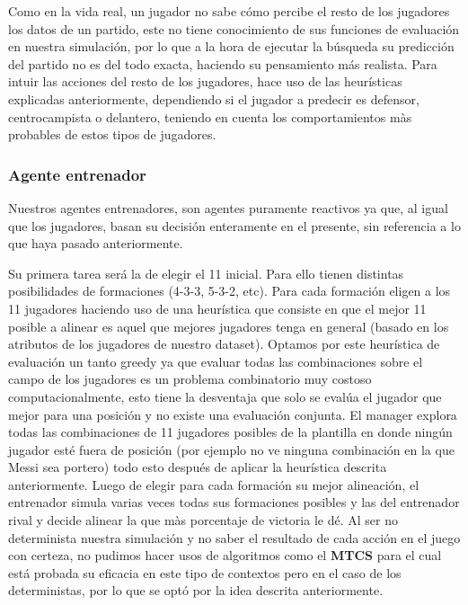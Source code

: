 \documentclass{article}
\begin{document}
Como en la vida real, un jugador no sabe cómo percibe el resto de los jugadores los datos de un partido, este no 
tiene conocimiento de sus funciones de evaluación en nuestra simulación, por lo que a la hora de ejecutar la búsqueda
su predicción del partido no es del todo exacta, haciendo su pensamiento más realista. Para intuir las acciones del 
resto de los jugadores, hace uso de las heurísticas explicadas anteriormente, dependiendo si el jugador a predecir 
es defensor, centrocampista o delantero, teniendo en cuenta los comportamientos màs probables de estos tipos de 
jugadores.

\subsubsection{Agente entrenador}
Nuestros agentes entrenadores, son agentes puramente reactivos ya que, al igual que los jugadores, basan 
su decisión enteramente en el presente, sin referencia a lo que haya pasado anteriormente.

Su primera tarea será la de elegir el 11 inicial. Para ello tienen distintas posibilidades de formaciones 
(4-3-3, 5-3-2, etc). Para cada formación eligen a los 11 jugadores haciendo uso de una heurística que consiste en 
que el mejor 11 posible a alinear es aquel que mejores jugadores tenga en general (basado en los atributos de los 
jugadores de nuestro dataset). Optamos por este heurística de evaluación un tanto greedy ya que evaluar todas las 
combinaciones sobre el campo de los jugadores es un problema combinatorio muy costoso computacionalmente, esto tiene la
desventaja que solo se evalúa el jugador que mejor para una posición y no existe una evaluación conjunta. El manager 
explora todas las combinaciones de 11 jugadores posibles de la plantilla en donde ningún jugador esté fuera de 
posición (por ejemplo no ve ninguna combinación en la que Messi sea portero) todo esto después de aplicar la 
heurística descrita anteriormente. Luego de elegir para cada formación su mejor alineación, el entrenador simula 
varias veces todas sus formaciones posibles y las del entrenador rival y decide alinear la que màs porcentaje de 
victoria le dé. Al ser no determinista nuestra simulación y no saber el resultado de cada acción en el juego con 
certeza, no pudimos hacer usos de algoritmos como el \textbf{MTCS} para el cual está probada su eficacia en este tipo de 
contextos pero en el caso de los deterministas, por lo que se optó por la idea descrita anteriormente.
\end{document}
